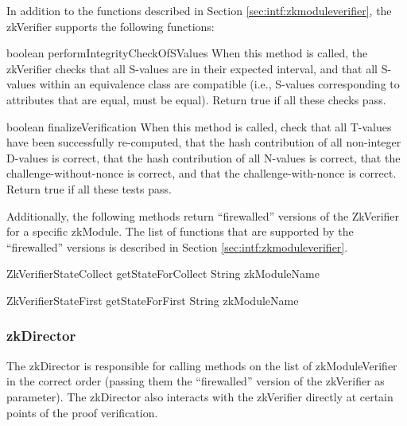   In addition to the functions described in Section \ref{sec:intf:zkmoduleverifier}, the zkVerifier supports the following functions:

  \begin{method}
  {boolean}
  {performIntegrityCheckOfSValues}
  {
  }
  When this method is called, the zkVerifier checks that all S-values are in their expected interval, and that
  all S-values within an equivalence class are compatible (i.e., S-values corresponding to attributes that are equal,
  must be equal). Return true if all these checks pass.
  \end{method}

  \begin{method}
  {boolean}
  {finalizeVerification}
  {
  }
  When this method is called, check that all T-values have been successfully re-computed, that the hash
  contribution of all non-integer D-values is correct, that the hash contribution of all N-values is correct,
  that the challenge-without-nonce is correct, and that the challenge-with-nonce is correct.
  Return true if all these tests pass.
  \end{method}

  Additionally, the following methods return ``firewalled'' versions of the ZkVerifier
  for a specific zkModule. The list of functions that
  are supported by the ``firewalled'' versions is described in Section \ref{sec:intf:zkmoduleverifier}.

  \begin{method}
  {ZkVerifierStateCollect}
  {getStateForCollect}
  {
    {String zkModuleName}
  }
  \end{method}
  \begin{method}
  {ZkVerifierStateFirst}
  {getStateForFirst}
  {
    {String zkModuleName}
  }
  \end{method}

  \subsubsection{zkDirector}
  The zkDirector is responsible for calling methods on the list of zkModuleVerifier in the correct order (passing them the
  ``firewalled'' version of the zkVerifier as parameter). The zkDirector also interacts with the zkVerifier directly at certain
  points of the proof verification.

